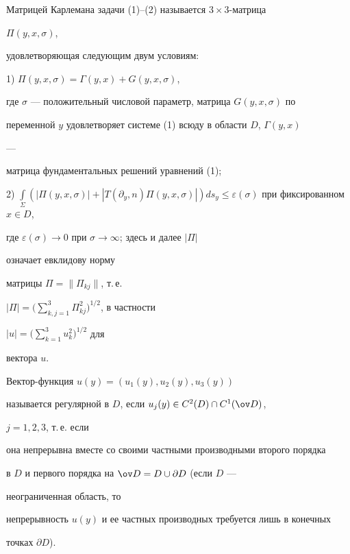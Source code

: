 \begin{defn} 


Матрицей Карлемана задачи (1)--(2) называется $3\times3$-матрица 


$\Pi(y,x,\sigma)$, 


удовлетворяющая следующим двум условиям: 


 


1) $\Pi(y,x,\sigma)=\Gamma(y,x)+G(y,x,\sigma)$, 


где $\sigma$ --- положительный числовой параметр, матрица $G(y,x,\sigma)$ по 


переменной $y$ удовлетворяет системе (1) всюду в области $D$, $\Gamma(y,x)$ 


--- 


матрица фундаментальных решений уравнений (1); 


 


2) $\int\limits_\Sigma(|\Pi(y,x,\sigma)|+ |T(\partial_y,n) \Pi(y,x,\sigma)|) 


ds_y\le \varepsilon(\sigma)$ при фиксированном $x\in D$, 


где $\varepsilon(\sigma)\to0$ при $\sigma\to\infty$; здесь и далее $|\Pi|$ 


означает евклидову норму 


матрицы $\Pi=\|\Pi_{kj}\|$, т.\,е. 


$|\Pi|=\Big(\sum\limits^3_{k,j=1}\Pi^2_{kj}\Big)^{1/2}$, в частности 


$|u|=\Big(\sum\limits^3_{k=1}u^2_k\Big)^{1/2}$ для 


вектора $u$. 


\end{defn} 


 


 


\begin{defn} 


Вектор-функция $u(y)=(u_1(y),u_2(y),u_3(y))$ 


называется регулярной в $D$, если $u_j(y)\in C^2(D)\cap C^1(\ov D)$, 


$j=1,2,3$, т.\,е. если 


она непрерывна вместе со своими частными производными второго порядка 


в $D$ и первого порядка на $\ov D=D\cup\partial D$ (если $D$ --- 


неограниченная область, то 


непрерывность $u(y)$ и ее частных производных требуется лишь в конечных 


точках $\partial D$). 


\end{defn} 


